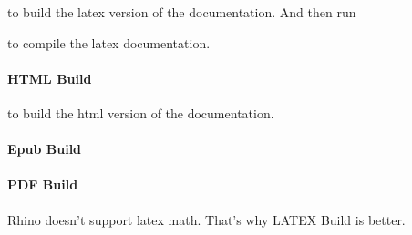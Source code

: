 \documentclass[letterpaper,10pt,english]{sphinxmanual}
\begin{document}
to build the latex version of the documentation. And then run

\begin{sphinxVerbatim}[commandchars=\\\{\}]
 \PYGZbs{}\PYGZbs{}  
\end{sphinxVerbatim}

to compile the latex documentation.


\paragraph{HTML Build}
\label{\detokenize{howto:html-build}}
\begin{sphinxVerbatim}[commandchars=\\\{\}]
     \PYGZbs{} \PYGZbs{}\PYGZbs{}
\end{sphinxVerbatim}

to build the html version of the documentation.


\paragraph{Epub Build}
\label{\detokenize{howto:epub-build}}
\begin{sphinxVerbatim}[commandchars=\\\{\}]
     \PYGZbs{} \PYGZbs{}\PYGZbs{}
\end{sphinxVerbatim}


\paragraph{PDF Build}
\label{\detokenize{howto:pdf-build}}
Rhino doesn’t support latex math. That’s why LATEX Build is better.

\begin{sphinxVerbatim}[commandchars=\\\{\}]
   \PYGZbs{} \PYGZbs{}\PYGZbs{}
\end{sphinxVerbatim}
\end{document}
